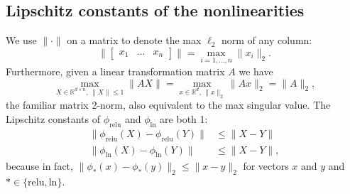 \documentclass{article}
\begin{document}
\subsection{Lipschitz constants of the nonlinearities}
We use $\|\cdot\|$ on a matrix to denote the max $\ell_2$ norm of any column:
\begin{equation*}
  \|\begin{bmatrix} x_1 & \ldots & x_n\end{bmatrix} \| = \max_{i=1,\ldots,n} \|x_i\|_2.
\end{equation*}
Furthermore, given a linear transformation matrix $A$ we have 
\begin{equation*}
  \max_{X\in\mathbb R^{d\times n},\, \|X\|\leq 1} \|AX\| = 
  \max_{x\in\mathbb R^d,\, \|x\|_2} \|Ax\|_2 = \|A\|_2,
\end{equation*}
the familiar matrix 2-norm, also equivalent to the max singular value.
The Lipschitz constants of $\phi_\text{relu}$ and $\phi_\text{ln}$ are both 1:
\begin{align*}
  \|\phi_\text{relu}(X) - \phi_\text{relu}(Y)\| &\leq \|X - Y\|\\
  \|\phi_\text{ln}(X) - \phi_\text{ln}(Y)\| &\leq \|X - Y\|,
\end{align*}
because in fact, $\|\phi_*(x) - \phi_*(y)\|_2 \leq \|x-y\|_2$ for vectors 
$x$ and $y$ and $*\in\{\text{relu}, \text{ln}\}$.
\end{document}
